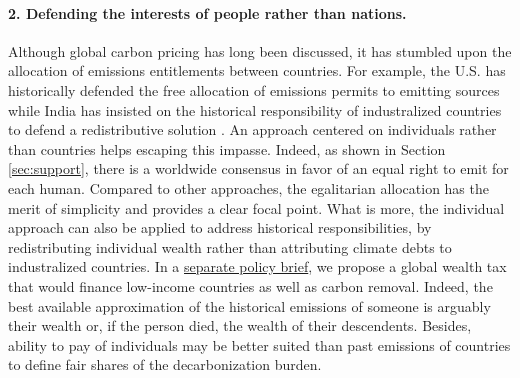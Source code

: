 \documentclass[12pt,english]{article}
\begin{document}
\paragraph*{2. Defending the interests of people rather than nations.}
Although global carbon pricing has long been discussed, it has stumbled upon the allocation of emissions entitlements between countries. 
For example, the U.S. has historically defended the free allocation of emissions permits to emitting sources while India has insisted on the historical responsibility of industralized countries to defend a redistributive solution \citep{bertram_tradeable_1992,michaelowa_report_2012}. 
An approach centered on individuals rather than countries helps escaping this impasse. Indeed, as shown in Section \ref{sec:support}, there is a worldwide consensus in favor of an equal right to emit for each human. 
Compared to other approaches, the egalitarian allocation has the merit of simplicity and provides a clear focal point. 
What is more, the individual approach can also be applied to address historical responsibilities, by redistributing individual wealth rather than attributing climate debts to industralized countries. In a \href{https://github.com/bixiou/global_tax_attitudes/blob/main/paper/policy_brief_tax.pdf}{separate policy brief}, %
we propose a global wealth tax that would finance low-income countries as well as carbon removal. 
Indeed, the best available approximation of the historical emissions of someone is arguably their wealth or, if the person died, the wealth of their descendents. Besides, ability to pay of individuals may be better suited than past emissions of countries to define fair shares of the decarbonization burden. %
\end{document}
